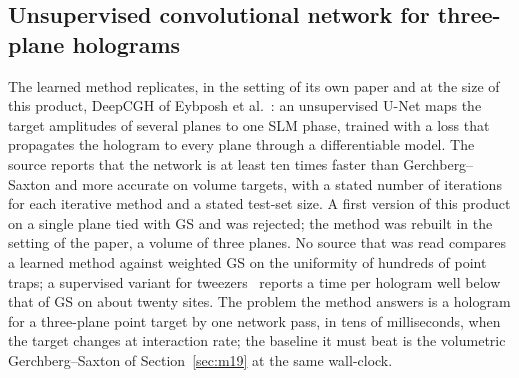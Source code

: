 
\subsection{Unsupervised convolutional network for three-plane holograms}\label{sec:m17}

The learned method replicates, in the setting of its own paper and at the size of this product, DeepCGH of Eybposh et al.~\cite{eybposh}: an unsupervised U-Net maps the target amplitudes of several planes to one SLM phase, trained with a loss that propagates the hologram to every plane through a differentiable model. The source reports that the network is at least ten times faster than Gerchberg--Saxton and more accurate on volume targets, with a stated number of iterations for each iterative method and a stated test-set size. A first version of this product on a single plane tied with GS and was rejected; the method was rebuilt in the setting of the paper, a volume of three planes. No source that was read compares a learned method against weighted GS on the uniformity of hundreds of point traps; a supervised variant for tweezers~\cite{ren2024} reports a time per hologram well below that of GS on about twenty sites. The problem the method answers is a hologram for a three-plane point target by one network pass, in tens of milliseconds, when the target changes at interaction rate; the baseline it must beat is the volumetric Gerchberg--Saxton of Section~\ref{sec:m19} at the same wall-clock.

